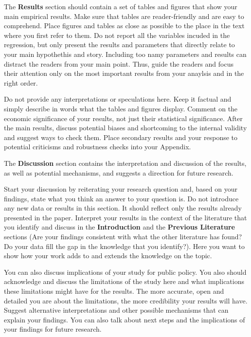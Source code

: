 \documentclass[
]{book}
\begin{document}
The \textbf{Results} section should contain a set of tables and figures
that show your main empirical results. Make sure that tables are
reader-friendly and are easy to comprehend. Place figures and tables as
close as possible to the place in the text where you first refer to
them. Do not report all the variables incuded in the regression, but
only present the results and parameters that directly relate to your
main hypothethis and story. Including too namy parameters and results
can distract the readers from your main point. Thus, guide the readers
and focus their attention only on the most important results from your
anaylsis and in the right order.

Do not provide any interpretations or speculations here. Keep it factual
and simply describe in words what the tables and figures display.
Comment on the economic significance of your results, not just their
statistical significance. After the main results, discuss potential
biases and shortcoming to the internal validity and suggest ways to
check them. Place secondary results and your response to potential
criticisms and robustness checks into your Appendix.

The \textbf{Discussion} section contains the interpretation and
discussion of the results, as well as potential mechanisms, and suggests
a direction for future research.

Start your discussion by reiterating your research question and, based
on your findings, state what you think an answer to your question is. Do
not introduce any new data or results in this section. It should reflect
only the results already presented in the paper. Interpret your results
in the context of the literature that you identify and discuss in the
\textbf{Introduction} and the \textbf{Previous Literature} sections (Are
your findings consistent with what the other literature has found? Do
your data fill the gap in the knowledge that you identify?). Here you
want to show how your work adds to and extends the knowledge on the
topic.

You can also discuss implications of your study for public policy. You
also should acknowledge and discuss the limitations of the study here
and what implications these limitations might have for the results. The
more accurate, open and detailed you are about the limitations, the more
credibility your results will have. Suggest alternative interpretations
and other possible mechanisms that can explain your findings. You can
also talk about next steps and the implications of your findings for
future research.
\end{document}
